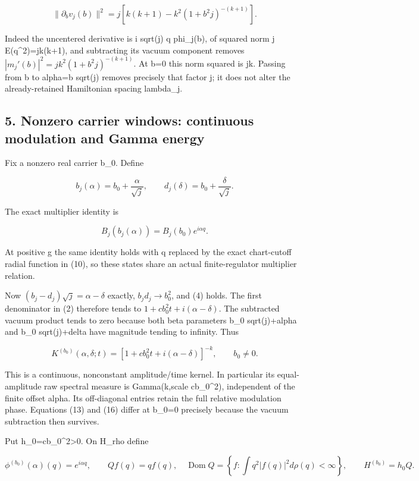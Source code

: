 \documentclass[
  11pt,
]{article}
\begin{document}
\[
 \|\partial_b v_j(b)\|^2
 =j\left[k(k+1)-k^2(1+b^2j)^{-(k+1)}\right].
\]

Indeed the uncentered derivative is i sqrt(j) q phi\_j(b), of squared
norm j E(q\^{}2)=jk(k+1), and subtracting its vacuum component removes
\(|m_j'(b)|^2=jk^2(1+b^2j)^{-(k+1)}\). At b=0 this norm squared is jk.
Passing from b to alpha=b sqrt(j) removes precisely that factor j; it
does not alter the already-retained Hamiltonian spacing lambda\_j.

\subsection{5. Nonzero carrier windows: continuous modulation and Gamma
energy}\label{weak-coupling-part-5-nonzero-carrier-windows-continuous-modulation-and-gamma-energy}

Fix a nonzero real carrier b\_0. Define

\[
 b_j(\alpha)=b_0+\frac{\alpha}{\sqrt j},\qquad
 d_j(\delta)=b_0+\frac{\delta}{\sqrt j}.
\]

The exact multiplier identity is

\[
 B_j(b_j(\alpha))=B_j(b_0)e^{i\alpha q}.
 \tag{15}
\]

At positive g the same identity holds with q replaced by the exact
chart-cutoff radial function in (10), so these states share an actual
finite-regulator multiplier relation.

Now \((b_j-d_j)\sqrt j=\alpha-\delta\) exactly, \(b_jd_j\to b_0^2\), and
(4) holds. The first denominator in (2) therefore tends to
\(1+cb_0^2t+i(\alpha-\delta)\). The subtracted vacuum product tends to
zero because both beta parameters b\_0 sqrt(j)+alpha and b\_0
sqrt(j)+delta have magnitude tending to infinity. Thus

\[
 \boxed{
 K^{(b_0)}(\alpha,\delta;t)=
 [1+cb_0^2t+i(\alpha-\delta)]^{-k},\qquad b_0\ne0.
 }
 \tag{16}
\]

This is a continuous, nonconstant amplitude/time kernel. In particular
its equal-amplitude raw spectral measure is Gamma(k,scale cb\_0\^{}2),
independent of the finite offset alpha. Its off-diagonal entries retain
the full relative modulation phase. Equations (13) and (16) differ at
b\_0=0 precisely because the vacuum subtraction then survives.

Put h\_0=cb\_0\^{}2\textgreater0. On H\_rho define

\[
 \phi^{(b_0)}(\alpha)(q)=e^{i\alpha q},\qquad
 Qf(q)=qf(q),\quad
 \operatorname{Dom}Q=\left\{f:\int q^2|f(q)|^2d\rho(q)<\infty\right\},
 \qquad H^{(b_0)}=h_0Q.
 \tag{17}
\]
\end{document}
